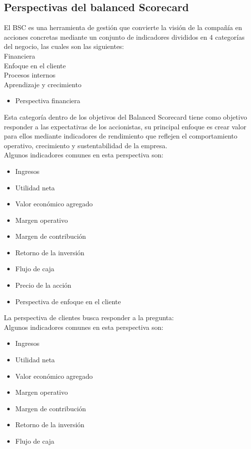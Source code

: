 \documentclass[%
 reprint,
 amsmath,amssymb,
 aps,
]{revtex4-1}
\begin{document}
\subsection{ Perspectivas del  balanced Scorecard }

El BSC es una herramienta de gestión que convierte la visión de la compañía en acciones concretas mediante un conjunto de indicadores divididos en 4 categorías del negocio, las cuales son las siguientes:\\

Financiera  \\
Enfoque en el cliente  \\
Procesos internos  \\
Aprendizaje y crecimiento  \\
\begin{itemize}
\item Perspectiva financiera
\end{itemize}
Esta categoría dentro de los objetivos del Balanced Scorecard tiene como objetivo responder a las expectativas de los accionistas, su principal enfoque es crear valor para ellos mediante indicadores de rendimiento que reflejen el comportamiento operativo, crecimiento y sustentabilidad de la empresa.\\

Algunos indicadores comunes en esta perspectiva son:
\begin{itemize}
\item Ingresos
\item Utilidad neta
\item Valor económico agregado
\item Margen operativo
\item Margen de contribución
\item Retorno de la inversión
\item Flujo de caja
\item Precio de la acción
\end{itemize}
\begin{itemize}
\item Perspectiva de enfoque en el cliente
\end{itemize}
La perspectiva de clientes busca responder a la pregunta:\\

Algunos indicadores comunes en esta perspectiva son:
\begin{itemize}
\item Ingresos
\item Utilidad neta
\item Valor económico agregado
\item Margen operativo
\item Margen de contribución
\item Retorno de la inversión
\item Flujo de caja\\
\end{itemize}
\end{document}
